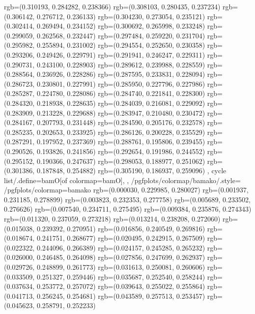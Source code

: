 {{{					rgb=(0.310193, 0.284282, 0.238366)
					rgb=(0.308103, 0.280435, 0.237234)
					rgb=(0.306142, 0.276712, 0.236133)
					rgb=(0.304230, 0.273054, 0.235121)
					rgb=(0.302414, 0.269494, 0.234152)
					rgb=(0.300692, 0.265998, 0.233248)
					rgb=(0.299059, 0.262568, 0.232447)
					rgb=(0.297484, 0.259220, 0.231704)
					rgb=(0.295982, 0.255894, 0.231002)
					rgb=(0.294554, 0.252650, 0.230358)
					rgb=(0.293206, 0.249426, 0.229791)
					rgb=(0.291941, 0.246247, 0.229311)
					rgb=(0.290731, 0.243100, 0.228903)
					rgb=(0.289612, 0.239988, 0.228559)
					rgb=(0.288564, 0.236926, 0.228286)
					rgb=(0.287595, 0.233831, 0.228094)
					rgb=(0.286723, 0.230801, 0.227991)
					rgb=(0.285950, 0.227796, 0.227986)
					rgb=(0.285287, 0.224780, 0.228086)
					rgb=(0.284740, 0.221841, 0.228300)
					rgb=(0.284320, 0.218938, 0.228635)
					rgb=(0.284039, 0.216081, 0.229092)
					rgb=(0.283909, 0.213228, 0.229688)
					rgb=(0.283947, 0.210480, 0.230472)
					rgb=(0.284167, 0.207793, 0.231448)
					rgb=(0.284590, 0.205176, 0.232578)
					rgb=(0.285235, 0.202653, 0.233925)
					rgb=(0.286126, 0.200228, 0.235529)
					rgb=(0.287291, 0.197952, 0.237369)
					rgb=(0.288761, 0.195806, 0.239455)
					rgb=(0.290526, 0.193826, 0.241856)
					rgb=(0.292654, 0.191986, 0.244552)
					rgb=(0.295152, 0.190366, 0.247637)
					rgb=(0.298053, 0.188977, 0.251062)
					rgb=(0.301386, 0.187848, 0.254882)
					rgb=(0.305190, 0.186937, 0.259096)
			},
		cycle list/.define={bamO}{[of colormap=bamO]},
		},
		/pgfplots/colormap/bamako/.style={
			/pgfplots/colormap={bamako}{%
					rgb=(0.000030, 0.229985, 0.280027)
					rgb=(0.001937, 0.231185, 0.278899)
					rgb=(0.003823, 0.232353, 0.277758)
					rgb=(0.005689, 0.233502, 0.276626)
					rgb=(0.007540, 0.234711, 0.275495)
					rgb=(0.009384, 0.235876, 0.274343)
					rgb=(0.011320, 0.237059, 0.273218)
					rgb=(0.013214, 0.238208, 0.272060)
					rgb=(0.015038, 0.239392, 0.270951)
					rgb=(0.016856, 0.240549, 0.269816)
					rgb=(0.018674, 0.241751, 0.268677)
					rgb=(0.020495, 0.242915, 0.267509)
					rgb=(0.022322, 0.244096, 0.266389)
					rgb=(0.024157, 0.245285, 0.265232)
					rgb=(0.026000, 0.246485, 0.264098)
					rgb=(0.027856, 0.247699, 0.262937)
					rgb=(0.029726, 0.248899, 0.261773)
					rgb=(0.031613, 0.250081, 0.260606)
					rgb=(0.033509, 0.251327, 0.259446)
					rgb=(0.035687, 0.252540, 0.258244)
					rgb=(0.037634, 0.253772, 0.257072)
					rgb=(0.039643, 0.255022, 0.255864)
					rgb=(0.041713, 0.256245, 0.254681)
					rgb=(0.043589, 0.257513, 0.253457)
					rgb=(0.045623, 0.258791, 0.252233)
}}}
